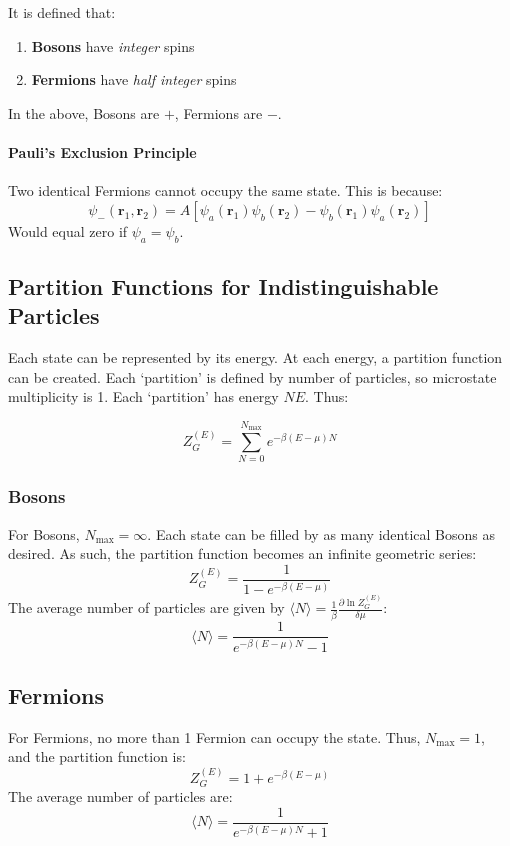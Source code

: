 \documentclass[12pt]{article}
\begin{document}
It is defined that:
\begin{enumerate}
    \item \textbf{Bosons} have \textit{integer} spins
    \item \textbf{Fermions} have \textit{half integer} spins
\end{enumerate}

In the above, Bosons are $+$, Fermions are $-$.

\paragraph{Pauli's Exclusion Principle}
Two identical Fermions cannot occupy the same state. This is because:
\[\psi_-(\mathbf{r}_1, \mathbf{r}_2) = A[\psi_a(\mathbf{r}_1)\psi_b(\mathbf{r}_2)-\psi_b(\mathbf{r}_1)\psi_a(\mathbf{r}_2)]\]
Would equal zero if $\psi_a = \psi_b$.

\subsection{Partition Functions for Indistinguishable Particles}

Each state can be represented by its energy. At each energy, a partition function can be created. Each `partition' is defined by number of particles, so microstate multiplicity is 1. Each `partition' has energy $NE$. Thus:

\[Z^{(E)}_G = \sum_{N=0}^{N_\text{max}} e^{-\beta(E-\mu)N}\]


\subsubsection{Bosons}
For Bosons, $N_\text{max} = \infty$. Each state can be filled by as many identical Bosons as desired. As such, the partition function becomes an infinite geometric series:
\[\boxed{Z_G^{(E)} = \frac{1}{1-e^{-\beta(E-\mu)}}}\]
The average number of particles are given by $\langle N \rangle = \frac{1}{\beta}\frac{\partial \ln Z_G^{(E)}}{\delta \mu}$:
\[\boxed{\langle N \rangle = \frac{1}{e^{-\beta(E-\mu)N}-1}}\]

\subsection{Fermions}
For Fermions, no more than 1 Fermion can occupy the state. Thus, $N_\text{max} = 1$, and the partition function is:
\[\boxed{Z^{(E)}_G = 1 + e^{-\beta(E-\mu)}}\]
The average number of particles are:
\[\langle N \rangle = \frac{1}{e^{-\beta(E-\mu)N}+1}\]
\end{document}
